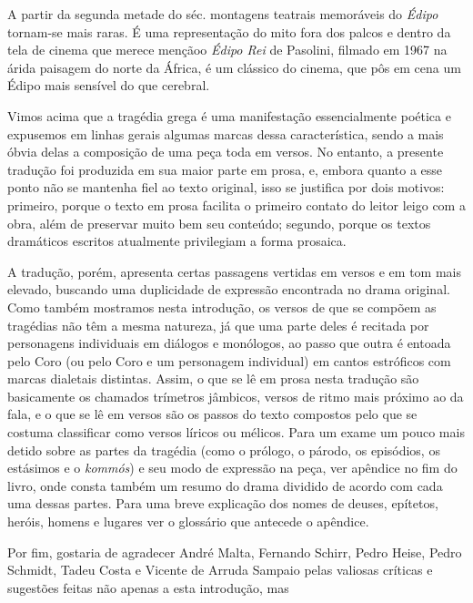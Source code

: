 A partir da segunda metade do séc.  montagens teatrais memoráveis do
\emph{Édipo} tornam-se mais raras. É uma representação do mito fora dos
palcos e dentro da tela de cinema que merece menção\quad o \emph{Édipo Rei}
de Pasolini, filmado em 1967 na árida paisagem do norte da
África, é um clássico do cinema, que pôs em cena um Édipo mais sensível
do que cerebral.

\asterisc{}

Vimos acima que a tragédia grega é uma manifestação essencialmente
poética e expusemos em linhas gerais algumas marcas dessa
característica, sendo a mais óbvia delas a composição de uma peça toda
em versos. No entanto, a presente tradução foi produzida em sua maior
parte em prosa, e, embora quanto a esse ponto não se mantenha fiel ao
texto original, isso se justifica por dois motivos: primeiro, porque o
texto em prosa facilita o primeiro contato do leitor leigo com a obra,
além de preservar muito bem seu conteúdo; segundo, porque os textos
dramáticos escritos atualmente privilegiam a forma prosaica.

A tradução, porém, apresenta certas passagens vertidas em versos e em
tom mais elevado, buscando uma duplicidade de expressão encontrada no
drama original. Como também mostramos nesta introdução, os versos de que
se compõem as tragédias não têm a mesma natureza, já que uma parte deles
é recitada por personagens individuais em diálogos e monólogos, ao passo
que outra é entoada pelo Coro (ou pelo Coro e um personagem individual)
em cantos estróficos com marcas dialetais distintas. Assim, o que se lê
em prosa nesta tradução são basicamente os chamados trímetros jâmbicos,
versos de ritmo mais próximo ao da fala, e o que se lê em versos são os
passos do texto compostos pelo que se costuma classificar como versos
líricos ou mélicos. Para um exame um pouco mais detido sobre as partes
da tragédia (como o prólogo, o párodo, os episódios, os estásimos e o
\emph{kommós}) e seu modo de expressão na peça, ver apêndice no fim do
livro, onde consta também um resumo do drama dividido de acordo com cada
uma dessas partes. Para uma breve explicação dos nomes de deuses,
epítetos, heróis, homens e lugares ver o glossário que antecede o
apêndice.

\asterisc

Por fim, gostaria de agradecer André Malta, Fernando Schirr, Pedro
Heise, Pedro Schmidt, Tadeu Costa e Vicente de Arruda Sampaio pelas
valiosas críticas e sugestões feitas não apenas a esta introdução, mas
